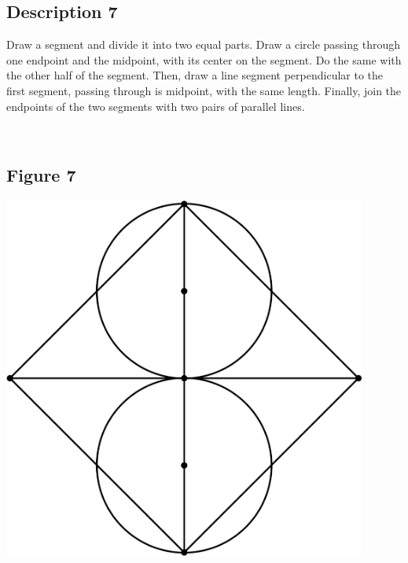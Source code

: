 \documentclass[12pt,a4paper,article,english,firamath]{nsi}
\begin{document}
\maketitle

\subsection*{Description 7}
{\brettley 

Draw a segment and divide it into two equal parts. Draw a circle passing through one endpoint and the midpoint, with its
center on the segment. Do the same with the other half of the segment. Then, draw a line segment perpendicular to the
first segment, passing through is midpoint, with the same length. Finally, join the endpoints of the two segments with
two pairs of parallel lines.}\\[1em]



\subsection*{Figure 7}
\begin{center}
    \includegraphics[height=12cm]{img/fig07.png}
\end{center}
\end{document}
